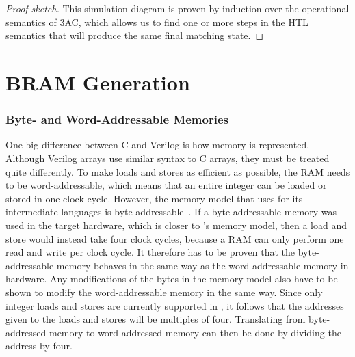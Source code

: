 \begin{proof}[Proof sketch]
  This simulation diagram is proven by induction over the operational semantics
  of 3AC, which allows us to find one or more steps in the HTL semantics that
  will produce the same final matching state.
\end{proof}

\section{BRAM Generation}%
\label{sec:hg:bram-generation}

\subsubsection{Byte- and Word-Addressable Memories}

One big difference between C and Verilog is how memory is represented.  Although
Verilog arrays use similar syntax to C arrays, they must be treated quite
differently. To make loads and stores as efficient as possible, the RAM needs to
be word-addressable, which means that an entire integer can be loaded or stored
in one clock cycle.  However, the memory model that \compcert{} uses for its
intermediate languages is
byte-addre\-ssa\-ble~\cite{blazy05_formal_verif_memor_model_c}.  If a
byte-addressable memory was used in the target hardware, which is closer to
\compcert{}'s memory model, then a load and store would instead take four clock
cycles, because a RAM can only perform one read and write per clock cycle.  It
therefore has to be proven that the byte-addressable memory behaves in the same
way as the word-addressable memory in hardware.  Any modifications of the bytes
in the \compcert{} memory model also have to be shown to modify the
word-addressable memory in the same way.  Since only integer loads and stores
are currently supported in \vericert{}, it follows that the addresses given to
the loads and stores will be multiples of four.  Translating from byte-addressed
memory to word-addressed memory can then be done by dividing the address by
four.

